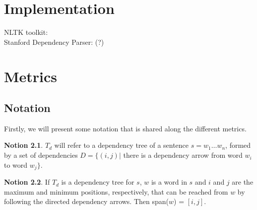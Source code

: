 \documentclass{report}
\theoremstyle{definition}
\newtheorem{notion}{Notion}
\theoremstyle{plain}
\begin{document}
%
%

\appendix
\chapter{Implementation}
\label{appendix:impl}

NLTK toolkit: \cite{bird2009natural}\\
Stanford Dependency Parser: \cite{de2008stanford}(?)

%
%



%
%

\chapter{Metrics}
\label{appendix:metric}

\section{Notation}

Firstly, we will present some notation that is shared along the different metrics.

\begin{notion}
$T_d$ will refer to a dependency tree of a sentence $s = w_1 \dots w_n$, formed by a set of dependencies $D = \{ (i,j) |$ there is a dependency arrow from word $w_i$ to word $w_j \}$.
\end{notion}

\begin{notion}
If $T_d$ is a dependency tree for $s$, $w$ is a word in $s$ and $i$ and $j$ are the maximum and minimum positions, respectively, that can be reached from $w$ by following the directed dependency arrows. Then span($w$) = $[i,j]$.
\end{notion}
\end{document}
